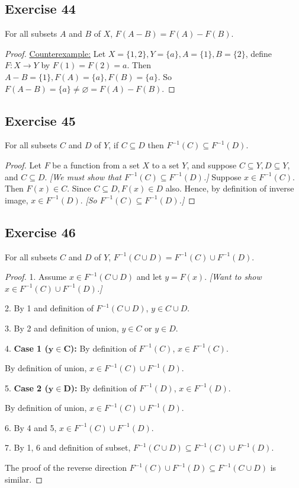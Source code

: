 \documentclass[14pt]{extarticle}
\newcommand{\es}{\varnothing}
\begin{document}
\subsection{Exercise 44}
For all subsets $A$ and $B$ of $X$, \(F(A - B) = F(A) - F(B)\).

\begin{proof}
\underline{Counterexample:} Let \(X = \{1, 2\}, Y = \{a\}, A = \{1\}, B = \{2\}\), define \(F: X \to Y\) by 
\(F(1) = F(2) = a\). Then \(A - B = \{1\}, F(A) = \{a\}, F(B)=\{a\}\). So \(F(A-B) = \{a\} \neq \es = F(A) - F(B)\).
\end{proof}

\subsection{Exercise 45}
For all subsets $C$ and $D$ of $Y$, if \(C \subseteq D\) then \(F^{-1}(C) \subseteq F^{-1}(D)\).

\begin{proof}
Let $F$ be a function from a set $X$ to a set $Y$, and suppose \(C \subseteq Y, D \subseteq Y\), and 
\(C \subseteq D\). {\it [We must show that \(F^{-1}(C) \subseteq F^{-1}(D)\).]} Suppose \(x \in F^{-1}(C)\). Then 
\(F(x) \in C\). Since \(C \subseteq D, F(x) \in D\) also. Hence, by definition of inverse image, \(x \in F^{-1}(D)\). 
{\it [So \(F^{-1}(C) \subseteq F^{-1}(D)\).]}
\end{proof}

\subsection{Exercise 46}
For all subsets $C$ and $D$ of $Y$, \(F^{-1}(C \cup D) = F^{-1}(C) \cup F^{-1}(D)\).

\begin{proof}
1. Assume \(x \in F^{-1}(C \cup D)\) and let $y = F(x)$. {\it [Want to show \(x \in F^{-1}(C) \cup F^{-1}(D)\).]}

2. By 1 and definition of \(F^{-1}(C \cup D)\), \(y \in C \cup D\).

3. By 2 and definition of union, \(y \in C\) or \(y \in D\).

4. {\bf Case 1 (\(\bm{y \in C}\)):} By definition of \(F^{-1}(C)\), \(x \in F^{-1}(C)\). 

By definition of union, \(x \in F^{-1}(C) \cup F^{-1}(D)\).

5. {\bf Case 2 (\(\bm{y \in D}\)):} By definition of \(F^{-1}(D)\), \(x \in F^{-1}(D)\). 

By definition of union, \(x \in F^{-1}(C) \cup F^{-1}(D)\).

6. By 4 and 5, \(x \in F^{-1}(C) \cup F^{-1}(D)\).

7. By 1, 6 and definition of subset, \(F^{-1}(C \cup D) \subseteq F^{-1}(C) \cup F^{-1}(D)\).

The proof of the reverse direction \(F^{-1}(C) \cup F^{-1}(D) \subseteq F^{-1}(C \cup D)\) is similar.
\end{proof}
\end{document}
